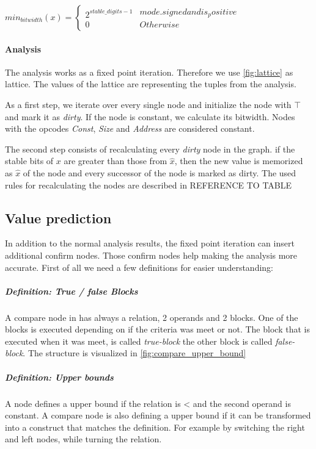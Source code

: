 $
min_{bitwidth}(x)=
\left\{
\begin{array}{l}2^{stable\_digits-1}\\0\end{array}
\begin{array}{l} {mode.signed and is_positive} \\ {Otherwise} \end{array}
\right.
$



\paragraph{Analysis} The analysis works as a fixed point iteration. Therefore we use  \ref{fig:lattice} as lattice. The values of the lattice are representing the tuples from the analysis.

As a first step, we iterate over every single node and initialize the node with $\top$ and mark it as \textit{dirty}. If the node is constant, we calculate its bitwidth. Nodes with the opcodes \textit{Const}, \textit{Size} and \textit{Address} are considered constant.

The second step consists of recalculating every \textit{dirty} node in the graph. if the stable bits of $x$ are greater than those from $\hat{x}$, then the new value is memorized as $\hat{x}$ of the node and every successor of the node is marked as dirty. The used rules for recalculating the nodes are described in REFERENCE TO TABLE %

\subsection{Value prediction}
In addition to the normal analysis results, the fixed point iteration can insert additional 
confirm nodes. Those confirm nodes help making the analysis more accurate.
First of all we need a few definitions for easier understanding:

\subparagraph{Definition: True / false Blocks}
A compare node in \libFIRM has always a relation, 2 operands and 2 blocks. One of the blocks is executed depending on if the criteria was meet or not. The block that is executed when it was meet, is called \emph{true-block} the other block is called \emph{false-block}. The structure is visualized in \ref{fig:compare_upper_bound}


\subparagraph{Definition: Upper bounds}
A node defines a upper bound if the relation is < and the second operand is constant.\newline
A compare node is also defining a upper bound if it can be transformed into a construct that matches the definition. For example by switching the right and left nodes, while turning the relation.


